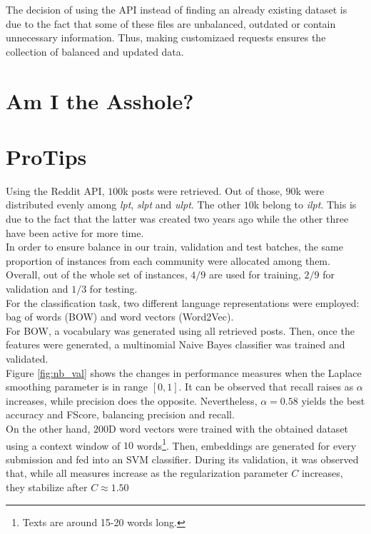 \documentclass[11pt,a4paper]{article}
\begin{document}
The decision of using the API instead of finding an already existing dataset is 
due to the fact that some of these files are unbalanced, outdated or contain unnecessary information. Thus, making customizaed requests ensures the collection of balanced and updated data. 

\section{Am I the Asshole?}
\label{sec:aita}

\section{ProTips}
\label{sec:protips}
Using the Reddit API, $100$k posts were retrieved. Out of those, $90$k were distributed
evenly among \textit{lpt}, \textit{slpt} and \textit{ulpt}. The other $10$k belong to
\textit{ilpt}. This is due to the fact that the latter was created two years ago
while the other three have been active for more time.\\
In order to ensure balance in our train, validation and test batches, the same proportion
of instances from each community were allocated among them.\\
Overall, out of the whole set of instances, $4/9$ are used for training, $2/9$ for
validation and $1/3$ for testing.\\

For the classification task, two different language representations were employed: bag
of words (BOW) and word vectors (Word2Vec).\\
For BOW, a vocabulary was generated using all retrieved posts. Then, once the features
were generated, a multinomial Naive Bayes classifier was trained and validated.\\
Figure \ref{fig:nb_val} shows the changes in performance measures when the Laplace
smoothing parameter is in range $[0, 1]$. It can be observed that recall raises as
$\alpha$ increases, while precision does the opposite. Nevertheless, $\alpha = 0.58$
yields the best accuracy and FScore, balancing precision and recall.\\
On the other hand, $200$D word vectors were trained with the obtained dataset using
a context window of $10$ words\footnote{Texts are around 15-20 words long.}.
Then, embeddings are generated for every submission and fed into an SVM classifier.
During its validation, it was observed that, while all measures increase as the
regularization parameter $C$ increases, they stabilize after $C \approx 	1.50$
\end{document}
